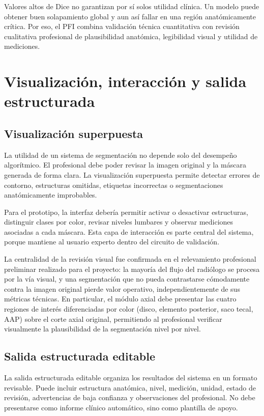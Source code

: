 Valores altos de Dice no garantizan por sí solos utilidad clínica. Un modelo puede obtener buen solapamiento global y aun así fallar en una región anatómicamente crítica. Por eso, el PFI combina validación técnica cuantitativa con revisión cualitativa profesional de plausibilidad anatómica, legibilidad visual y utilidad de mediciones.

\section{Visualización, interacción y salida estructurada}

\subsection{Visualización superpuesta}

La utilidad de un sistema de segmentación no depende solo del desempeño algorítmico. El profesional debe poder revisar la imagen original y la máscara generada de forma clara. La visualización superpuesta permite detectar errores de contorno, estructuras omitidas, etiquetas incorrectas o segmentaciones anatómicamente improbables.

Para el prototipo, la interfaz debería permitir activar o desactivar estructuras, distinguir clases por color, revisar niveles lumbares y observar mediciones asociadas a cada máscara. Esta capa de interacción es parte central del sistema, porque mantiene al usuario experto dentro del circuito de validación.

La centralidad de la revisión visual fue confirmada en el relevamiento profesional preliminar realizado para el proyecto: la mayoría del flujo del radiólogo se procesa por la vía visual, y una segmentación que no pueda contrastarse cómodamente contra la imagen original pierde valor operativo, independientemente de sus métricas técnicas. En particular, el módulo axial debe presentar las cuatro regiones de interés diferenciadas por color (disco, elemento posterior, saco tecal, AAP) sobre el corte axial original, permitiendo al profesional verificar visualmente la plausibilidad de la segmentación nivel por nivel.

\subsection{Salida estructurada editable}

La salida estructurada editable organiza los resultados del sistema en un formato revisable. Puede incluir estructura anatómica, nivel, medición, unidad, estado de revisión, advertencias de baja confianza y observaciones del profesional. No debe presentarse como informe clínico automático, sino como plantilla de apoyo.

